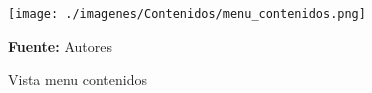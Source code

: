 \begin{figure}[!htb]
  \begin{center}
\texttt{[image: ./imagenes/Contenidos/menu\_contenidos.png]}
    \caption{Vista menu contenidos}
    \label{fig:Vista_menu_contenidos}
    \textbf{Fuente:}  Autores
  \end{center}
\end{figure}
